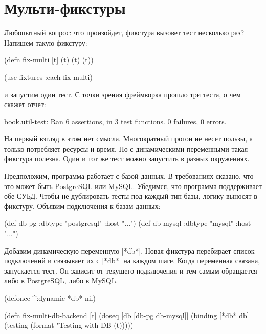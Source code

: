 \section{Мульти-фикстуры}

Любопытный вопрос: что произойдет, фикстура вызовет тест несколько раз? Напишем
такую фикстуру:

\begin{english}
  \begin{clojure}
(defn fix-multi [t]
  (t) (t) (t))

(use-fixtures :each fix-multi)
  \end{clojure}
\end{english}

\noindent
и запустим один тест. С точки зрения фреймворка прошло три теста, о чем скажет
отчет:

\begin{english}
  \begin{text}
book.util-test: Ran 6 assertions, in 3 test functions.
0 failures, 0 errors.
  \end{text}
\end{english}

На первый взгляд в этом нет смысла. Многократный прогон не несет пользы, а
только потребляет ресурсы и время. Но с динамическими переменными такая фикстура
полезна. Один и тот же тест можно запустить в разных окружениях.

Предположим, программа работает с базой данных. В требованиях сказано, что это
может быть PostgreSQL или MySQL. Убедимся, что программа поддерживает обе
СУБД. Чтобы не дублировать тесты под каждый тип базы, логику выносят в
фикстуру. Объявим подключения к базам данных:

\begin{english}
  \begin{clojure}
(def db-pg {:dbtype "postgresql" :host "..."})
(def db-mysql {:dbtype "mysql" :host "..."})
  \end{clojure}
\end{english}

Добавим динамическую переменную \spverb|*db*|. Новая фикстура перебирает список
подключений и связывает их с \spverb|*db*| на каждом шаге. Когда переменная
связана, запускается тест. Он зависит от текущего подключения и тем самым
обращается либо в PostgreSQL, либо в MySQL.

\begin{english}
  \begin{clojure}
(defonce ^:dynamic *db* nil)

(defn fix-multi-db-backend [t]
  (doseq [db [db-pg db-mysql]]
    (binding [*db* db]
      (testing (format "Testing with DB %
        (t)))))
  \end{clojure}
\end{english}

